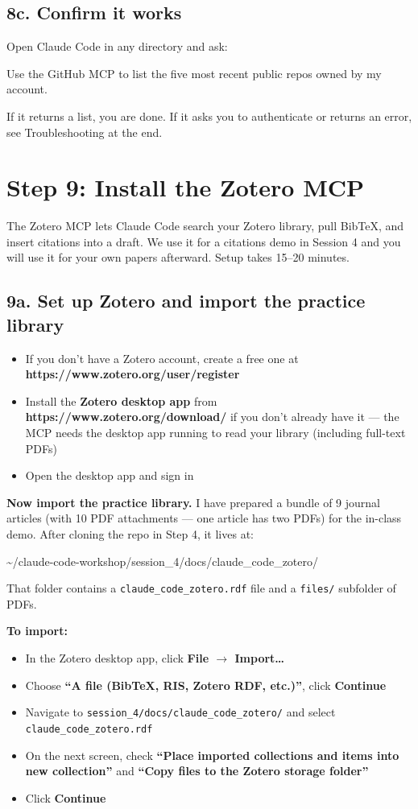 \documentclass[11pt]{article}
\newcommand{\cmd}[1]{\par\vspace{0.2em}\colorbox{codegray}{\parbox{\dimexpr\linewidth-2\fboxsep}{\ttfamily\small #1}}\par\vspace{0.2em}}
\begin{document}
\subsection*{8c. Confirm it works}
Open Claude Code in any directory and ask:
\cmd{Use the GitHub MCP to list the five most recent public repos owned by my account.}

If it returns a list, you are done. If it asks you to authenticate or returns an error, see Troubleshooting at the end.

\section*{Step 9: Install the Zotero MCP}
The Zotero MCP lets Claude Code search your Zotero library, pull BibTeX, and insert citations into a draft. We use it for a citations demo in Session 4 and you will use it for your own papers afterward. Setup takes 15--20 minutes.

\subsection*{9a. Set up Zotero and import the practice library}

\begin{itemize}[leftmargin=2em,itemsep=0pt]
  \item If you don't have a Zotero account, create a free one at \textbf{https://www.zotero.org/user/register}
  \item Install the \textbf{Zotero desktop app} from \textbf{https://www.zotero.org/download/} if you don't already have it --- the MCP needs the desktop app running to read your library (including full-text PDFs)
  \item Open the desktop app and sign in
\end{itemize}

\textbf{Now import the practice library.} I have prepared a bundle of 9 journal articles (with 10 PDF attachments --- one article has two PDFs) for the in-class demo. After cloning the repo in Step 4, it lives at:

\cmd{\textasciitilde/claude-code-workshop/session\_4/docs/claude\_code\_zotero/}

That folder contains a \texttt{claude\_code\_zotero.rdf} file and a \texttt{files/} subfolder of PDFs.

\textbf{To import:}
\begin{itemize}[leftmargin=2em,itemsep=0pt]
  \item In the Zotero desktop app, click \textbf{File $\rightarrow$ Import\ldots}
  \item Choose \textbf{``A file (BibTeX, RIS, Zotero RDF, etc.)''}, click \textbf{Continue}
  \item Navigate to \texttt{session\_4/docs/claude\_code\_zotero/} and select \texttt{claude\_code\_zotero.rdf}
  \item On the next screen, check \textbf{``Place imported collections and items into new collection''} and \textbf{``Copy files to the Zotero storage folder''}
  \item Click \textbf{Continue}
\end{itemize}
\end{document}
